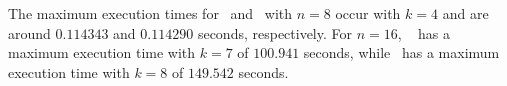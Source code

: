 \documentclass[11pt]{llncs}
\begin{document}

The maximum execution times for~\cite{AMC:DalMal23} and~\cite{Mat:ZJZQ23} with $n=8$ occur with $k=4$ and are around $0.114343$ and $0.114290$ seconds, respectively. For $n=16$, ~\cite{AMC:DalMal23} has a maximum execution time with $k=7$ of $100.941$ seconds, while~\cite{Mat:ZJZQ23} has a maximum execution time with $k=8$ of $149.542$ seconds. 
\end{document}
